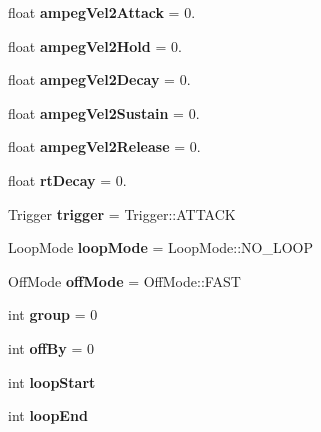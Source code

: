 \begin{DoxyCompactItemize}
float {\bfseries ampeg\+Vel2\+Attack} = 0.
\item 
\mbox{\label{struct_zone_abb69b5396ad67115c60f19110e38770e}} 
float {\bfseries ampeg\+Vel2\+Hold} = 0.
\item 
\mbox{\label{struct_zone_a3da7acced2f0bcd4d38cbb11b5ab121f}} 
float {\bfseries ampeg\+Vel2\+Decay} = 0.
\item 
\mbox{\label{struct_zone_abf4081f5c8e5be8a69c4e96b3ce193b2}} 
float {\bfseries ampeg\+Vel2\+Sustain} = 0.
\item 
\mbox{\label{struct_zone_aeb9ca8b16e3dffe8a814343d61219517}} 
float {\bfseries ampeg\+Vel2\+Release} = 0.
\item 
\mbox{\label{struct_zone_a46900187f1ba85eb8f9629cf3d9744d7}} 
float {\bfseries rt\+Decay} = 0.
\item 
\mbox{\label{struct_zone_a3aafa1e47a1f23c48331edcc715788e5}} 
Trigger {\bfseries trigger} = Trigger\+::\+A\+T\+T\+A\+CK
\item 
\mbox{\label{struct_zone_a3013c6a63c8f731a757af48843e90950}} 
Loop\+Mode {\bfseries loop\+Mode} = Loop\+Mode\+::\+N\+O\+\_\+\+L\+O\+OP
\item 
\mbox{\label{struct_zone_a67b79d7e4abee29ba333b750b5d5e415}} 
Off\+Mode {\bfseries off\+Mode} = Off\+Mode\+::\+F\+A\+ST
\item 
\mbox{\label{struct_zone_a1d98f2f3f29e0cf28d41488e82744e48}} 
int {\bfseries group} = 0
\item 
\mbox{\label{struct_zone_accf1975a997521741f2544905e83ef8c}} 
int {\bfseries off\+By} = 0
\item 
\mbox{\label{struct_zone_a7a8f10cdd8b60a59eb0bb552d395ded8}} 
int {\bfseries loop\+Start}
\item 
\mbox{\label{struct_zone_a8c5ac2c7bcebcbf711fe0a388bf4f0ac}} 
int {\bfseries loop\+End}
\item 

\end{DoxyCompactItemize}
